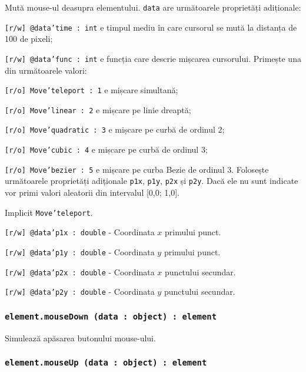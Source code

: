 Mută mouse-ul deasupra elementului. \texttt{data} are următoarele proprietăți adiționale:
\begin{icItems}
	\item \texttt{[r/w] @data'time : int} e timpul mediu în care cursorul se mută la distanța de 100 de pixeli;
	\item \texttt{[r/w] @data'func : int} e funcția care descrie mișcarea cursorului. Primește una din următoarele valori:
	\begin{icItems}
		\item \texttt{[r/o] Move'teleport : 1} e mișcare simultană;
		\item \texttt{[r/o] Move'linear : 2} e mișcare pe linie dreaptă;
		\item \texttt{[r/o] Move'quadratic : 3} e mișcare pe curbă de ordinul 2;
		\item \texttt{[r/o] Move'cubic : 4} e mișcare pe curbă de ordinul 3;
		\item \texttt{[r/o] Move'bezier : 5} e mișcare pe curba Bezie de ordinul 3. Folosește următoarele proprietăți adiționale \texttt{p1x}, \texttt{p1y}, \texttt{p2x} și \texttt{p2y}. Dacă ele nu sunt indicate vor primi valori aleatorii din intervalul [0,0; 1,0].
	\end{icItems}
	Implicit \texttt{Move'teleport}.
	\item \texttt{[r/w] @data'p1x : double} - Coordinata $x$ primului punct.
	\item \texttt{[r/w] @data'p1y : double} - Coordinata $y$ primului punct.
	\item \texttt{[r/w] @data'p2x : double} - Coordinata $x$ punctului secundar.
	\item \texttt{[r/w] @data'p2y : double} - Coordinata $y$ punctului secundar.
\end{icItems}

\subsubsection{\texttt{element.mouseDown (data : object) : element}}

Simulează apăsarea butonului mouse-ului.

\subsubsection{\texttt{element.mouseUp (data : object) : element}}

